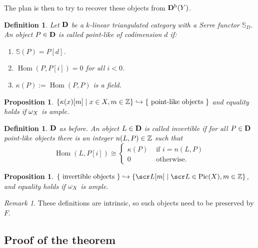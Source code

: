 \documentclass[A4paper, british, reqno]{amsart}
\theoremstyle{darkgreentheorem}
\newtheorem{prop}[thm]{Proposition}
\theoremstyle{darkbluedefinition}
\newtheorem{defn}[thm]{Definition}
\theoremstyle{darkredexample}
\theoremstyle{remark}
\newtheorem{rem}[thm]{Remark}
\DeclareMathOperator{\Hom}{Hom}
\DeclareMathOperator{\Pic}{Pic}
\renewcommand{\S}{\mathbb{S}}
\newcommand{\1}{\mathbbm{1}}
\newcommand{\mono}{\hookrightarrow}
\begin{document}
The plan is then to try to recover these objects from $\mathbf{D}^{\mathrm{b}}(Y)$.

\begin{defn}
    Let $\mathbf{D}$ be a $k$-linear triangulated category with a Serre functor $\S_{D}$.
    An object $P\in \mathbf{D}$ is called \textit{point-like} of codimension $d$ if:
    \begin{enumerate}
	\item $\S(P)=P[d]$.
	\item $\Hom(P,P[i])=0$ for all $i<0$.
	\item $\kappa(P):=\Hom(P,P)$ is a field.
    \end{enumerate}
\end{defn}

\begin{prop}
    $\{ \kappa(x)[m] \mid x\in X, m\in \Z\}\mono \{ \text{ point-like objects } \}$ and equality holds if $\omega_{X}$ is ample.
\end{prop}

\begin{defn}
    $\mathbf{D}$ as before.
    An object $L\in \mathbf{D}$ is called \textit{invertible} if for all $P\in \mathbf{D}$ point-like objects there is an integer $n(L,P)\in \mathbb{Z}$ such that
    \[ \Hom(L,P[i])\cong \begin{cases}
	\kappa(P) & \text{ if } i=n(L,P) \\
	0 & \text{ otherwise.}
    \end{cases}
    \]
\end{defn}

\begin{prop}
    $\{ \text{ invertible objects }\} \mono \{\L[m]\mid \L\in \Pic(X), m\in \Z\}$, and equality holds if $\omega_{X}$ is ample.
\end{prop}

\begin{rem}
    These definitions are intrinsic, so such objects need to be preserved by $F$.
\end{rem}

\subsection{Proof of the theorem}
\end{document}
